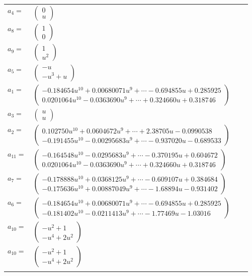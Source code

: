 \documentclass[1p]{elsarticle_modified}
\theoremstyle{definition}
\begin{document}
\begin{tabular}{m{7pt} m{180pt} m{7pt} m{180pt} }
\flushright $a_{4}=$&$\begin{pmatrix}0\\u\end{pmatrix}$ \\
\flushright $a_{8}=$&$\begin{pmatrix}1\\0\end{pmatrix}$ \\
\flushright $a_{9}=$&$\begin{pmatrix}1\\u^2\end{pmatrix}$ \\
\flushright $a_{5}=$&$\begin{pmatrix}- u\\- u^3+u\end{pmatrix}$ \\
\flushright $a_{1}=$&$\begin{pmatrix}-0.184654 u^{10}+0.00680071 u^{9}+\cdots-0.694855 u+0.285925\\0.0201064 u^{10}-0.0363690 u^{9}+\cdots+0.324660 u+0.318746\end{pmatrix}$ \\
\flushright $a_{3}=$&$\begin{pmatrix}u\\u\end{pmatrix}$ \\
\flushright $a_{2}=$&$\begin{pmatrix}0.102750 u^{10}+0.0604672 u^{9}+\cdots+2.38705 u-0.0990538\\-0.191455 u^{10}-0.00295683 u^{9}+\cdots-0.937020 u-0.689533\end{pmatrix}$ \\
\flushright $a_{11}=$&$\begin{pmatrix}-0.164548 u^{10}-0.0295683 u^{9}+\cdots-0.370195 u+0.604672\\0.0201064 u^{10}-0.0363690 u^{9}+\cdots+0.324660 u+0.318746\end{pmatrix}$ \\
\flushright $a_{7}=$&$\begin{pmatrix}-0.178888 u^{10}+0.0368125 u^{9}+\cdots-0.609107 u+0.384684\\-0.175636 u^{10}+0.00887049 u^{9}+\cdots-1.68894 u-0.931402\end{pmatrix}$ \\
\flushright $a_{6}=$&$\begin{pmatrix}-0.184654 u^{10}+0.00680071 u^{9}+\cdots-0.694855 u+0.285925\\-0.181402 u^{10}-0.0211413 u^{9}+\cdots-1.77469 u-1.03016\end{pmatrix}$ \\
\flushright $a_{10}=$&$\begin{pmatrix}- u^2+1\\- u^4+2 u^2\end{pmatrix}$\\ \flushright $a_{10}=$&$\begin{pmatrix}- u^2+1\\- u^4+2 u^2\end{pmatrix}$\\&\end{tabular}
\end{document}
